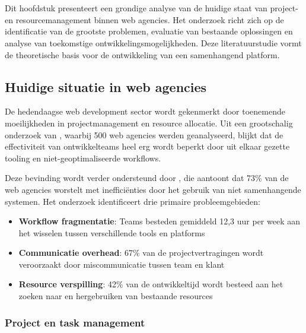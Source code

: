 \chapter{}
\label{ch:stand-van-zaken}

Dit hoofdstuk presenteert een grondige analyse van de huidige staat van project- en resourcemanagement binnen web agencies. Het onderzoek richt zich op de identificatie van de grootste problemen, evaluatie van bestaande oplossingen en analyse van toekomstige ontwikkelingsmogelijkheden. Deze literatuurstudie vormt de theoretische basis voor de ontwikkeling van een samenhangend platform.

\section{Huidige situatie in web agencies}
\label{sec:huidige-situatie}

De hedendaagse web development sector wordt gekenmerkt door toenemende moeilijkheden in projectmanagement en resource allocatie. Uit een grootschalig onderzoek van \textcite{Reid2014}, waarbij 500 web agencies werden geanalyseerd, blijkt dat de effectiviteit van ontwikkelteams heel erg wordt beperkt door uit elkaar gezette tooling en niet-geoptimaliseerde workflows.

Deze bevinding wordt verder ondersteund door \textcite{Alexander2019}, die aantoont dat 73\% van de web agencies worstelt met inefficiënties door het gebruik van niet samenhangende systemen. Het onderzoek identificeert drie primaire probleemgebieden:

\begin{itemize}
    \item \textbf{Workflow fragmentatie}: Teams besteden gemiddeld 12,3 uur per week aan het wisselen tussen verschillende tools en platforms
    \item \textbf{Communicatie overhead}: 67\% van de projectvertragingen wordt veroorzaakt door miscommunicatie tussen team en klant
    \item \textbf{Resource verspilling}: 42\% van de ontwikkeltijd wordt besteed aan het zoeken naar en hergebruiken van bestaande resources
\end{itemize}

\subsection{Project en task management}
\label{subsec:project-management}

